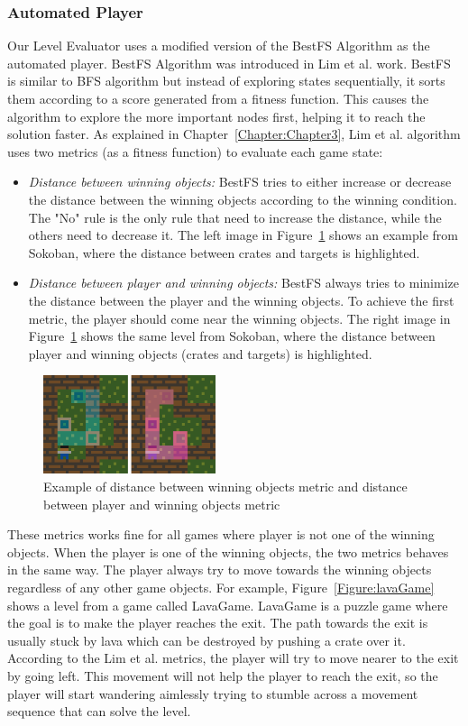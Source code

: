 \documentclass[letterpaper]{article}
\newcommand{\chref}[1]{Chapter~\ref{Chapter:#1}}
\newcommand{\figref}[1]{Figure~\ref{Figure:#1}}
\begin{document}
\subsubsection{Automated Player}\label{Section:automatedPlayer}
Our Level Evaluator uses a modified version of the BestFS Algorithm as the automated player. BestFS Algorithm was introduced in Lim et al.\cite{puzzleScriptGeneration} work. BestFS is similar to BFS algorithm but instead of exploring states sequentially, it sorts them according to a score generated from a fitness function. This causes the algorithm to explore the more important nodes first, helping it to reach the solution faster. As explained in \chref{Chapter3}, Lim et al. algorithm uses two metrics (as a fitness function) to evaluate each game state:
\begin{itemize}
	\item \emph{Distance between winning objects:} BestFS tries to either increase or decrease the distance between the winning objects according to the winning condition. The "No" rule is the only rule that need to increase the distance, while the others need to decrease it. The left image in \figref{bestFS} shows an example from Sokoban, where the distance between crates and targets is highlighted.
	\item \emph{Distance between player and winning objects:} BestFS always tries to minimize the distance between the player and the winning objects. To achieve the first metric, the player should come near the winning objects. The right image in \figref{bestFS} shows the same level from Sokoban, where the distance between player and winning objects (crates and targets) is highlighted.
\end{itemize}

\begin{figure}[ht]
	\centering
	\includegraphics[width=0.45\textwidth]{Images/scoreBestFS}
	\caption{Example of distance between winning objects metric and distance between player and winning objects metric}
	\label{Figure:bestFS}
\end{figure}

These metrics works fine for all games where player is not one of the winning objects. When the player is one of the winning objects, the two metrics behaves in the same way. The player always try to move towards the winning objects regardless of any other game objects. For example, \figref{lavaGame} shows a level from a game called LavaGame. LavaGame is a puzzle game where the goal is to make the player reaches the exit. The path towards the exit is usually stuck by lava which can be destroyed by pushing a crate over it. According to the Lim et al. metrics, the player will try to move nearer to the exit by going left. This movement will not help the player to reach the exit, so the player will start wandering aimlessly trying to stumble across a movement sequence that can solve the level.
\end{document}
